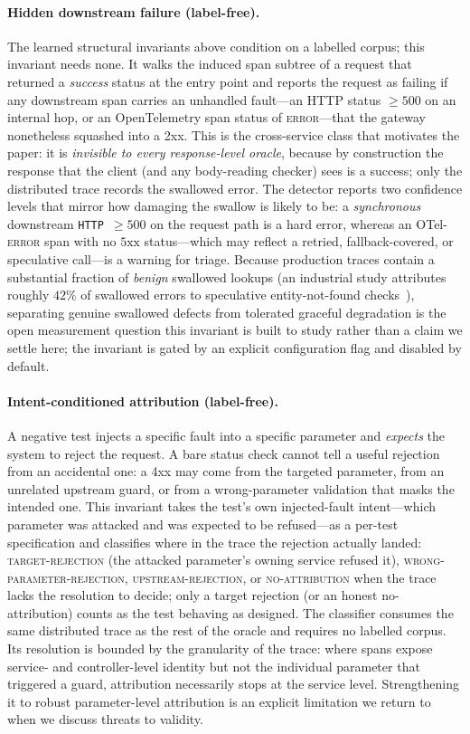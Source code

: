 \documentclass[conference]{IEEEtran}
\begin{document}
\paragraph{Hidden downstream failure (label-free).}
The learned structural invariants above condition on a labelled corpus; this invariant needs none.  It walks the induced span subtree of a request that returned a \emph{success} status at the entry point and reports the request as failing if any downstream span carries an unhandled fault---an HTTP status $\geq 500$ on an internal hop, or an OpenTelemetry span status of \textsc{error}---that the gateway nonetheless squashed into a 2xx.  This is the cross-service class that motivates the paper: it is \emph{invisible to every response-level oracle}, because by construction the response that the client (and any body-reading checker) sees is a success; only the distributed trace records the swallowed error.  The detector reports two confidence levels that mirror how damaging the swallow is likely to be: a \emph{synchronous} downstream \texttt{HTTP}~$\geq 500$ on the request path is a hard error, whereas an OTel-\textsc{error} span with no $5\textrm{xx}$ status---which may reflect a retried, fallback-covered, or speculative call---is a warning for triage.  Because production traces contain a substantial fraction of \emph{benign} swallowed lookups (an industrial study attributes roughly $42\%$ of swallowed errors to speculative entity-not-found checks~\cite{uber2025tale}), separating genuine swallowed defects from tolerated graceful degradation is the open measurement question this invariant is built to study rather than a claim we settle here; the invariant is gated by an explicit configuration flag and disabled by default.

\paragraph{Intent-conditioned attribution (label-free).}
A negative test injects a specific fault into a specific parameter and \emph{expects} the system to reject the request.  A bare status check cannot tell a useful rejection from an accidental one: a 4xx may come from the targeted parameter, from an unrelated upstream guard, or from a wrong-parameter validation that masks the intended one.  This invariant takes the test's own injected-fault intent---which parameter was attacked and was expected to be refused---as a per-test specification and classifies where in the trace the rejection actually landed: \textsc{target-rejection} (the attacked parameter's owning service refused it), \textsc{wrong-parameter-rejection}, \textsc{upstream-rejection}, or \textsc{no-attribution} when the trace lacks the resolution to decide; only a target rejection (or an honest no-attribution) counts as the test behaving as designed.  The classifier consumes the same distributed trace as the rest of the oracle and requires no labelled corpus.  Its resolution is bounded by the granularity of the trace: where spans expose service- and controller-level identity but not the individual parameter that triggered a guard, attribution necessarily stops at the service level.  Strengthening it to robust parameter-level attribution is an explicit limitation we return to when we discuss threats to validity.
\end{document}
